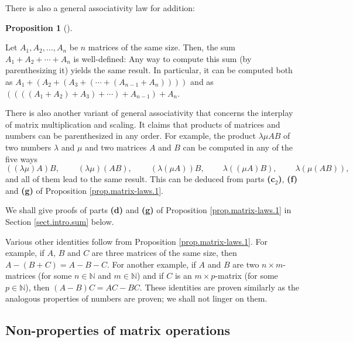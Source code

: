 \documentclass[numbers=enddot,12pt,final,onecolumn,notitlepage]{scrartcl}%
\theoremstyle{definition}
\newtheorem{prop}[theo]{Proposition}
\newenvironment{proposition}[1][]
{\begin{prop}[#1]\begin{leftbar}}
{\end{leftbar}\end{prop}}
\begin{document}
There is also a general associativity law for addition:

\begin{proposition}
\label{prop.matrix-laws.ga-add}Let $A_{1},A_{2},\ldots,A_{n}$ be $n$ matrices
of the same size. Then, the sum $A_{1}+A_{2}+\cdots+A_{n}$ is well-defined:
Any way to compute this sum (by parenthesizing it) yields the same result. In
particular, it can be computed both as $A_{1}+\left(  A_{2}+\left(
A_{3}+\left(  \cdots+\left(  A_{n-1}+A_{n}\right)  \right)  \right)  \right)
$ and as $\left(  \left(  \left(  \left(  A_{1}+A_{2}\right)  +A_{3}\right)
+\cdots\right)  +A_{n-1}\right)  +A_{n}$.
\end{proposition}

There is also another variant of general associativity that concerns the
interplay of matrix multiplication and scaling. It claims that products of
matrices and numbers can be parenthesized in any order. For example, the
product $\lambda\mu AB$ of two numbers $\lambda$ and $\mu$ and two matrices
$A$ and $B$ can be computed in any of the five ways%
\[
\left(  \left(  \lambda\mu\right)  A\right)  B,\ \ \ \ \ \ \ \ \ \ \left(
\lambda\mu\right)  \left(  AB\right)  ,\ \ \ \ \ \ \ \ \ \ \left(
\lambda\left(  \mu A\right)  \right)  B,\ \ \ \ \ \ \ \ \ \ \lambda\left(
\left(  \mu A\right)  B\right)  ,\ \ \ \ \ \ \ \ \ \ \lambda\left(  \mu\left(
AB\right)  \right)  ,
\]
and all of them lead to the same result. This can be deduced from parts
\textbf{(c}$_{2}$\textbf{)}, \textbf{(f)} and \textbf{(g)} of Proposition
\ref{prop.matrix-laws.1}.

We shall give proofs of parts \textbf{(d)} and \textbf{(g)} of Proposition
\ref{prop.matrix-laws.1} in Section \ref{sect.intro.sum} below.

Various other identities follow from Proposition \ref{prop.matrix-laws.1}. For
example, if $A$, $B$ and $C$ are three matrices of the same size, then
$A-\left(  B+C\right)  =A-B-C$. For another example, if $A$ and $B$ are two
$n\times m$-matrices (for some $n\in\mathbb{N}$ and $m\in\mathbb{N}$) and if
$C$ is an $m\times p$-matrix (for some $p\in\mathbb{N}$), then $\left(
A-B\right)  C=AC-BC$. These identities are proven similarly as the analogous
properties of numbers are proven; we shall not linger on them.

\subsection{Non-properties of matrix operations}
\end{document}

